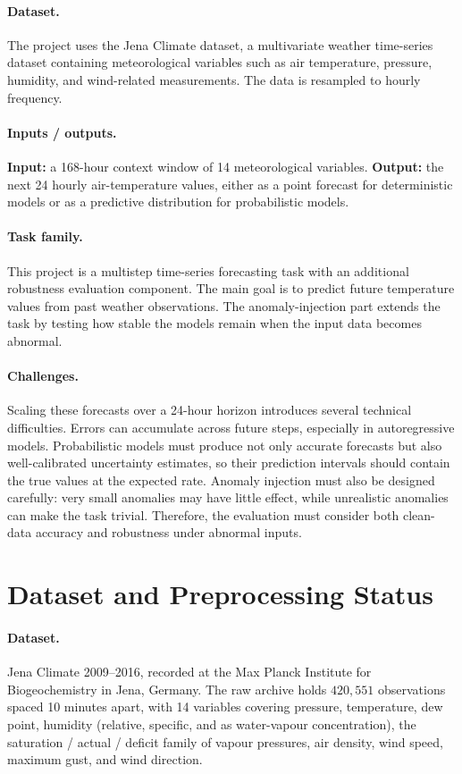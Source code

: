 \documentclass[11pt,a4paper]{article}
\begin{document}
\paragraph{Dataset.}
The project uses the Jena Climate dataset, a multivariate weather time-series dataset containing meteorological variables such as air temperature, pressure, humidity, and wind-related measurements. The data is resampled to hourly frequency.

\paragraph{Inputs / outputs.}
\textbf{Input:} a 168-hour context window of 14 meteorological variables. \textbf{Output:} the next 24 hourly air-temperature values, either as a point forecast for deterministic models or as a predictive distribution for probabilistic models.

\paragraph{Task family.}
This project is a multistep time-series forecasting task with an additional robustness evaluation component. The main goal is to predict future temperature values from past weather observations. The anomaly-injection part extends the task by testing how stable the models remain when the input data becomes abnormal.

\paragraph{Challenges.}
Scaling these forecasts over a 24-hour horizon introduces several technical difficulties. Errors can accumulate across future steps, especially in autoregressive models. Probabilistic models must produce not only accurate forecasts but also well-calibrated uncertainty estimates, so their prediction intervals should contain the true values at the expected rate. Anomaly injection must also be designed carefully: very small anomalies may have little effect, while unrealistic anomalies can make the task trivial. Therefore, the evaluation must consider both clean-data accuracy and robustness under abnormal inputs.

\section{Dataset and Preprocessing Status}

\paragraph{Dataset.}
Jena Climate 2009--2016, recorded at the Max Planck
Institute for Biogeochemistry in Jena, Germany. The raw archive holds
$420{,}551$ observations spaced 10 minutes apart, with 14 variables
covering pressure, temperature, dew point, humidity (relative,
specific, and as water-vapour concentration), the saturation /
actual / deficit family of vapour pressures, air density, wind speed,
maximum gust, and wind direction.
\end{document}
